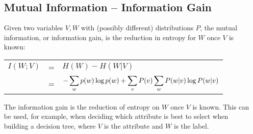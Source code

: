 \subsection{Mutual Information -- Information Gain}
\begin{definition}
Given two variables $V,W$ with (possibly different) distributions $P$, the mutual information, or information gain, is the reduction in entropy for $W$ once $V$ is known:
\begin{center}
	\begin{tabular}{rcl}
		$I(W; V)$&=&$H(W)-H(W\vert V)$\\
		&=&$-\displaystyle\sum_{w}p(w)\log{p(w)}+\displaystyle\sum_vP(v)\displaystyle\sum_wP(w\vert v)\log{P(w\vert v)}$
	\end{tabular}
\end{center}
\end{definition}
The information gain is the reduction of entropy on $W$ once $V$ is known. This can be used, for example, when deciding which attribute is best to select when building a decision tree, where $V$ is the attribute and $W$ is the label.